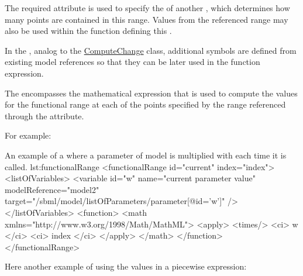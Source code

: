 The required attribute  is used to specify the  of another , which determines how many points are contained in this range.
Values from the referenced range may also be used within the function defining this .

In the , analog to the \hyperref[class:computeChange]{ComputeChange} class,  additional symbols are defined from existing model references so that they can be later used in the function expression. 

The  encompasses the mathematical expression that is used to compute the values for the functional range at each of the points specified by the range referenced through the  attribute. 

For example:

\begin{myXmlLst}{An example of a  where a parameter  of model  is multiplied with  each time it is called. }{lst:functionalRange}
    <functionalRange id="current" index="index"> 
      <listOfVariables> 
         <variable id="w" name="current parameter value"   
				                  modelReference="model2"
                          target="/sbml/model/listOfParameters/parameter[@id='w']" /> 
      </listOfVariables> 
      <function>
        <math xmlns="http://www.w3.org/1998/Math/MathML"> 
           <apply>
           <times/>
           <ci> w </ci> 
           <ci> index </ci> 
           </apply>
        </math>  
      </function>
    </functionalRange> 
\end{myXmlLst}

Here another example of using the values in a piecewise expression: 

